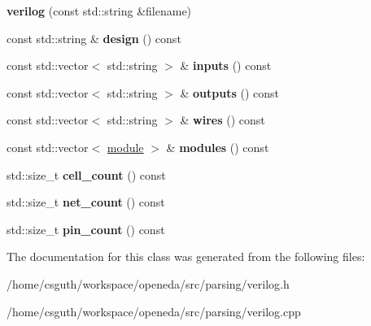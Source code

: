 \begin{DoxyCompactItemize}
\item 
\hypertarget{classophidian_1_1parsing_1_1verilog_a883088bafe74b0bde0ba2cd5c9969101}{{\bfseries verilog} (const std\-::string \&filename)}\label{classophidian_1_1parsing_1_1verilog_a883088bafe74b0bde0ba2cd5c9969101}

\item 
\hypertarget{classophidian_1_1parsing_1_1verilog_a19bdb4c708478cc63e658246fc76da25}{const std\-::string \& {\bfseries design} () const }\label{classophidian_1_1parsing_1_1verilog_a19bdb4c708478cc63e658246fc76da25}

\item 
\hypertarget{classophidian_1_1parsing_1_1verilog_a0e4ee7f46f5fb50032f6678121acb778}{const std\-::vector$<$ std\-::string $>$ \& {\bfseries inputs} () const }\label{classophidian_1_1parsing_1_1verilog_a0e4ee7f46f5fb50032f6678121acb778}

\item 
\hypertarget{classophidian_1_1parsing_1_1verilog_a6f7da2fb568496ce28f75ea902da0851}{const std\-::vector$<$ std\-::string $>$ \& {\bfseries outputs} () const }\label{classophidian_1_1parsing_1_1verilog_a6f7da2fb568496ce28f75ea902da0851}

\item 
\hypertarget{classophidian_1_1parsing_1_1verilog_a8b078b2f448a73812e63479aa92608c7}{const std\-::vector$<$ std\-::string $>$ \& {\bfseries wires} () const }\label{classophidian_1_1parsing_1_1verilog_a8b078b2f448a73812e63479aa92608c7}

\item 
\hypertarget{classophidian_1_1parsing_1_1verilog_a04da039acc1c12984852fed499a41407}{const std\-::vector$<$ \hyperlink{structophidian_1_1parsing_1_1verilog_1_1module}{module} $>$ \& {\bfseries modules} () const }\label{classophidian_1_1parsing_1_1verilog_a04da039acc1c12984852fed499a41407}

\item 
\hypertarget{classophidian_1_1parsing_1_1verilog_a7d6d968bb68e67eb1612f31935f56f67}{std\-::size\-\_\-t {\bfseries cell\-\_\-count} () const }\label{classophidian_1_1parsing_1_1verilog_a7d6d968bb68e67eb1612f31935f56f67}

\item 
\hypertarget{classophidian_1_1parsing_1_1verilog_a0a31007633478291f967b5dd9f1a94bf}{std\-::size\-\_\-t {\bfseries net\-\_\-count} () const }\label{classophidian_1_1parsing_1_1verilog_a0a31007633478291f967b5dd9f1a94bf}

\item 
\hypertarget{classophidian_1_1parsing_1_1verilog_af2ee6e37a0f0b854268c376868ac8ae5}{std\-::size\-\_\-t {\bfseries pin\-\_\-count} () const }\label{classophidian_1_1parsing_1_1verilog_af2ee6e37a0f0b854268c376868ac8ae5}

\end{DoxyCompactItemize}


The documentation for this class was generated from the following files\-:\begin{DoxyCompactItemize}
\item 
/home/csguth/workspace/openeda/src/parsing/verilog.\-h\item 
/home/csguth/workspace/openeda/src/parsing/verilog.\-cpp\end{DoxyCompactItemize}
